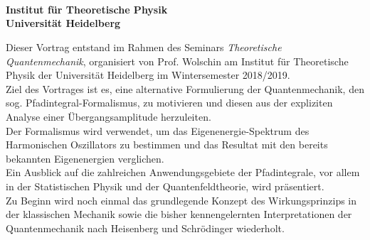 \begin{center}

	\makeatletter
	\thispagestyle{plain}
	\LARGE\textbf{\@title} \\
	\vspace{2mm}
	\large\bfseries{\@author} \\
	\normalfont
	\vspace{2mm}
	\large{\@date} \\
	\vspace{2mm}
	\large{Institut für Theoretische Physik \\
		Universität Heidelberg} \\
	\makeatother
\end{center}

\normalsize

Dieser Vortrag entstand im Rahmen des Seminars \textit{Theoretische Quantenmechanik}, organisiert von Prof. Wolschin am Institut für Theoretische Physik der Universität Heidelberg im Wintersemester 2018/2019. \\
Ziel des Vortrages ist es, eine alternative Formulierung der Quantenmechanik, den sog. Pfadintegral-Formalismus, zu motivieren und diesen aus der expliziten Analyse einer  Übergangsamplitude herzuleiten.  \\
Der Formalismus wird verwendet, um das Eigenenergie-Spektrum des Harmonischen Oszillators zu bestimmen und das Resultat mit den bereits bekannten Eigenenergien verglichen. \\
Ein Ausblick auf die zahlreichen Anwendungsgebiete der Pfadintegrale, vor allem in der Statistischen Physik und der Quantenfeldtheorie, wird präsentiert. \\
Zu Beginn wird noch einmal das grundlegende Konzept des Wirkungsprinzips in der klassischen Mechanik sowie die bisher kennengelernten Interpretationen der Quantenmechanik nach Heisenberg und Schrödinger wiederholt.